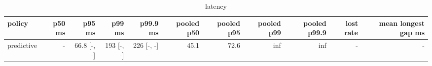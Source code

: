 \begin{table}[t]\centering\small
\begin{tabular}{lrrrrrrrrrr}\toprule
policy & p50 ms & p95 ms & p99 ms & p99.9 ms & pooled p50 & pooled p95 & pooled p99 & pooled p99.9 & lost rate & mean longest gap ms \\\midrule
predictive & - & 66.8 [-, -] & 193 [-, -] & 226 [-, -] & 45.1 & 72.6 & inf & inf & - & - \\
\bottomrule\end{tabular}\caption{latency}\end{table}
